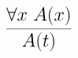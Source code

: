 \documentclass[14pt,border=2pt]{standalone}
\begin{document}
        $$
        \LARGE 

\begin{prooftree}
\hypo{\forall x~ A(x)}
\infer1{A(t)}
\end{prooftree}
        $$
        
\end{document}
